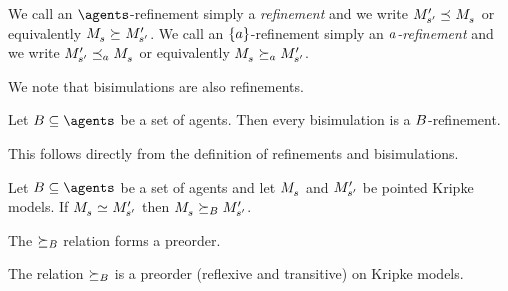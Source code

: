 We call an $\agents$-refinement simply a {\em refinement} and we write $\kPModelP{\kStateSP} \refines \kPModel{\kStateS}$ or equivalently $\kPModel{\kStateS} \simulates \kPModelP{\kStateSP}$.
We call an $\{a\}$-refinement simply an {\em $a$-refinement} and we write $\kPModelP{\kStateSP} \refinesA \kPModel{\kStateS}$ or equivalently $\kPModel{\kStateS} \simulatesA \kPModelP{\kStateSP}$.

We note that bisimulations are also refinements.

\begin{proposition}\label{bisimulation-refinement}
Let $\agentsB \subseteq \agents$ be a set of agents. Then every bisimulation is a $B$-refinement.
\end{proposition}

This follows directly from the definition of refinements and bisimulations.

\begin{corollary}\label{bisimilar-refinement}
Let $\agentsB \subseteq \agents$ be a set of agents and let $\kPModel{\kStateS}$ and ${M^{\prime}_{{s}^{\prime}}}$ be pointed Kripke models.
If $\kPModel{\kStateS} \bisimilar \kPModelP{\kStateSP}$ then $\kPModel{\kStateS} \simulatesBs \kPModelP{\kStateSP}$.
\end{corollary}

The $\succeq_{B}$ relation forms a preorder.

\begin{proposition}\label{refinements-preorder}
The relation $\succeq_{B}$ is a preorder (reflexive and transitive) on Kripke models.
\end{proposition}


